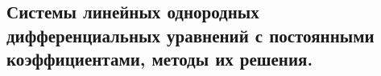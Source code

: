 \subsection{Системы линейных однородных дифференциальных уравнений с постоянными коэффициентами, методы их решения.}
